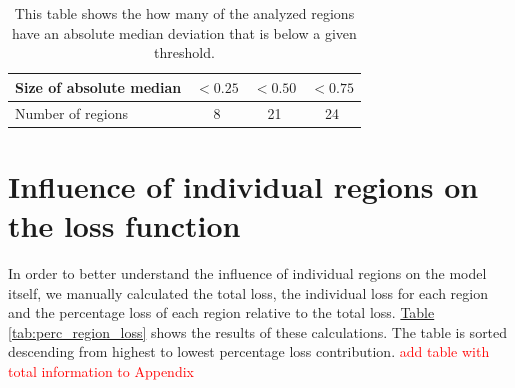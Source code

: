 \begin{table}[h]
	\centering
	\caption{This table shows the how many of the analyzed regions have an absolute median deviation that is below a given threshold.}
	\begin{tabular}{|l||c|c|c|}
		\hline
		Size of absolute median & $< 0.25$ & $< 0.50$ & $< 0.75$ \\ \hline
		Number of regions & 8 & 21 & 24 \\ \hline
	\end{tabular}
	\label{tab:50d_regions}
\end{table}


\section{Influence of individual regions on the loss function}
In order to better understand the influence of individual regions on the model itself, we manually calculated the total
loss, the individual loss for each region and the percentage loss of each region relative to the total loss.
\hyperref[tab:perc_region_loss]{Table \ref*{tab:perc_region_loss}} shows the results of these calculations. The table
is sorted descending from highest to lowest percentage loss contribution.
\textcolor{red}{add table with total information to Appendix}

